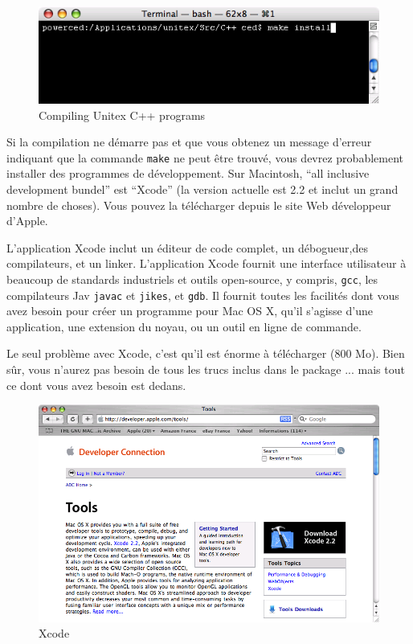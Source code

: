 \begin{figure}[!h]
\begin{center}
\includegraphics[width=12cm]{resources/img/fig-mac3.png}
\caption{Compiling Unitex C++ programs\label{fig-mac3}}
\end{center}
\end{figure}

\bigskip
\noindent Si la compilation ne démarre pas et que vous obtenez un message d'erreur
indiquant que la commande \verb+make+ ne peut être trouvé, vous devrez probablement
installer des programmes de développement. Sur Macintosh, ``all inclusive development
bundel'' est ``Xcode'' (la version actuelle est 2.2 et inclut un grand nombre
de choses). Vous pouvez la télécharger depuis le site Web développeur d'Apple.

\bigskip
\noindent L'application Xcode inclut un éditeur de code complet, un débogueur,des compilateurs, et
un linker. L'application Xcode fournit une interface utilisateur à beaucoup de standards industriels
et outils open-source, y compris, \verb+gcc+, les compilateurs Jav \verb+javac+ et \verb+jikes+, et
\verb+gdb+. Il fournit toutes les facilités dont vous avez besoin pour créer un programme pour Mac
OS X, qu'il s'agisse d'une application, une extension du noyau, ou un outil en ligne de commande.


\bigskip
\noindent Le seul problème avec Xcode, c'est qu'il est énorme à télécharger (800 Mo).
Bien sûr, vous n'aurez pas besoin de tous les trucs inclus dans le package ... mais tout
ce dont vous avez besoin est dedans.

\begin{figure}[!h]
\begin{center}
\includegraphics[width=15cm]{resources/img/fig-mac4.png}
\caption{Xcode\label{fig-mac4}}
\end{center}
\end{figure}


